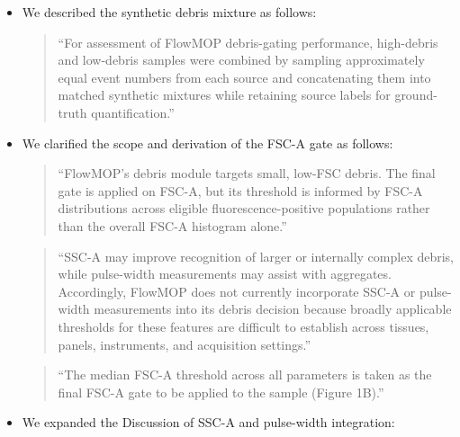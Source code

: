\documentclass[
  11pt,
  a4paper,
]{article}
\begin{document}
\begin{itemize}
\item
  We described the synthetic debris mixture as follows:

  \begin{quote}
  ``For assessment of FlowMOP debris-gating performance, high-debris and
  low-debris samples were combined by sampling approximately equal event
  numbers from each source and concatenating them into matched synthetic
  mixtures while retaining source labels for ground-truth
  quantification.''
  \end{quote}
\item
  We clarified the scope and derivation of the FSC-A gate as follows:

  \begin{quote}
  ``FlowMOP's debris module targets small, low-FSC debris. The final
  gate is applied on FSC-A, but its threshold is informed by FSC-A
  distributions across eligible fluorescence-positive populations rather
  than the overall FSC-A histogram alone.''
  \end{quote}

  \begin{quote}
  ``SSC-A may improve recognition of larger or internally complex
  debris, while pulse-width measurements may assist with aggregates.
  Accordingly, FlowMOP does not currently incorporate SSC-A or
  pulse-width measurements into its debris decision because broadly
  applicable thresholds for these features are difficult to establish
  across tissues, panels, instruments, and acquisition settings.''
  \end{quote}

  \begin{quote}
  ``The median FSC-A threshold across all parameters is taken as the
  final FSC-A gate to be applied to the sample (Figure 1B).''
  \end{quote}
\item
  We expanded the Discussion of SSC-A and pulse-width integration:


\end{itemize}
\end{document}
